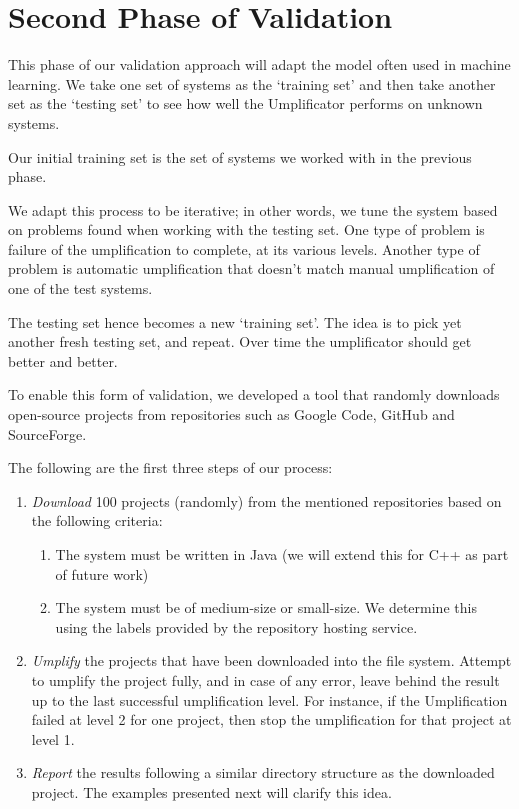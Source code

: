 \section{Second Phase of Validation}

This phase of our validation approach will adapt the model often used in machine learning. We take one set of systems as the `training set' and then take another set as the `testing set' to see how well the Umplificator performs on unknown systems.

Our initial training set is the set of systems we worked with in the previous phase.

We adapt this process to be iterative; in other words, we  tune the system based on problems found when working with the testing set. One type of problem is  failure of the umplification to complete, at its various levels. Another type of problem is automatic umplification that doesn't match manual umplification of one of the test systems.

The testing set hence becomes a new `training set'. The idea is to pick yet another fresh testing set, and repeat. Over time the umplificator should get better and better.

To enable this form of validation, we developed a tool that randomly downloads open-source projects from repositories such as Google Code, GitHub and SourceForge.

The following are the first three steps of our process:

\begin{enumerate}
\item \textit{Download} 100 projects (randomly) from the mentioned repositories based on the following criteria: 
	\begin{enumerate}
	\item The system must be written in Java (we will extend this for C++ as part of future work)
	\item The system must be of medium-size or small-size. We determine this using the labels provided by the repository hosting service.
	\end{enumerate}
\item \textit{Umplify} the projects that have been downloaded into the file system. Attempt to umplify the project fully, and in case of any error, leave behind the result up to the last successful umplification level. For instance, if the Umplification failed at level 2 for one project, then stop the umplification for that project at level 1.

\item \textit{Report} the results following a similar directory structure as the downloaded project. The examples presented next will clarify this idea.
\end{enumerate}

